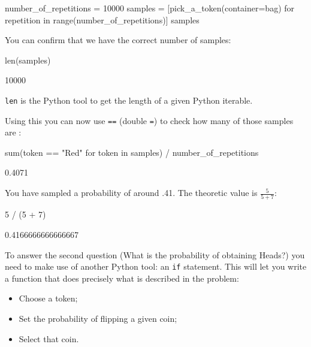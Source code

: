 \begin{pyin}
number_of_repetitions = 10000
samples = [pick_a_token(container=bag) for repetition in range(number_of_repetitions)]
samples
\end{pyin}





\begin{pyin}
\end{pyin}

You can confirm that we have the correct number of samples:

\begin{pyin}
len(samples)
\end{pyin}

\begin{raw}
10000
\end{raw}

\begin{note}
\texttt{len} is the Python tool to get the length of a given Python iterable.
\end{note}



Using this you can now use \texttt{==} (double \texttt{=}) to check how many of those 
samples are :

\begin{pyin}
sum(token == "Red" for token in samples) / number_of_repetitions
\end{pyin}

\begin{raw}
0.4071
\end{raw}

You have sampled a probability of around .41. The theoretic value is \(\frac{5}{5 +
7}\):


\begin{pyin}
5 / (5 + 7)
\end{pyin}





\begin{raw}
0.4166666666666667
\end{raw}






To answer the second question (What is the probability of obtaining Heads?) you
need to make use of another Python tool: an \texttt{if} statement. This will let
you
write a function that does precisely what is described in the problem:
\begin{itemize}
\item 

Choose a token;

\item 

Set the probability of flipping a given coin;

\item 

Select that coin.

\end{itemize}


